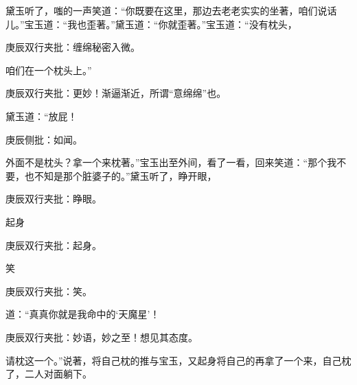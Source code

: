 \begin{parag}
    黛玉听了，嗤的一声笑道：“你既要在这里，那边去老老实实的坐著，咱们说话儿。”宝玉道：“我也歪著。”黛玉道：“你就歪著。”宝玉道：“没有枕头，\begin{note}庚辰双行夹批：缠绵秘密入微。\end{note}咱们在一个枕头上。”\begin{note}庚辰双行夹批：更妙！渐逼渐近，所谓“意绵绵”也。\end{note}黛玉道：“放屁！\begin{note}庚辰侧批：如闻。\end{note}外面不是枕头？拿一个来枕著。”宝玉出至外间，看了一看，回来笑道：“那个我不要，也不知是那个脏婆子的。”黛玉听了，睁开眼，\begin{note}庚辰双行夹批：睁眼。\end{note}起身\begin{note}庚辰双行夹批：起身。\end{note}笑\begin{note}庚辰双行夹批：笑。\end{note}道：“真真你就是我命中的‘天魔星’！\begin{note}庚辰双行夹批：妙语，妙之至！想见其态度。\end{note}请枕这一个。”说著，将自己枕的推与宝玉，又起身将自己的再拿了一个来，自己枕了，二人对面躺下。
\end{parag}


